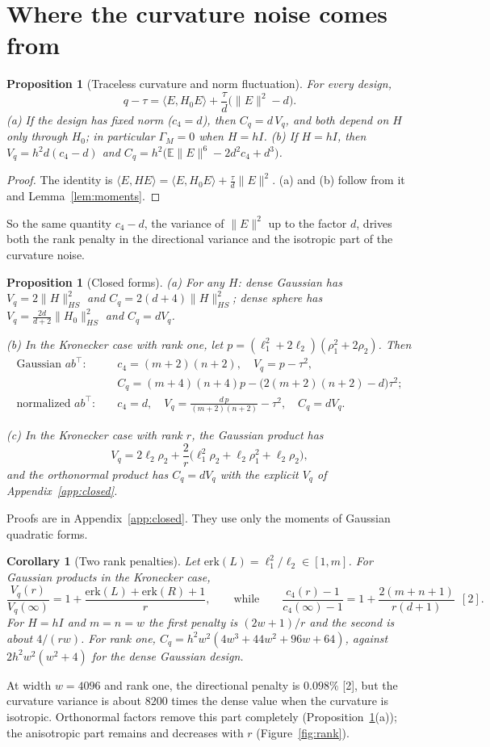 \documentclass[11pt]{article}
\newtheorem{proposition}[theorem]{Proposition}
\newtheorem{corollary}[theorem]{Corollary}
\theoremstyle{remark}
\newcommand{\E}{\mathbb{E}}
\newcommand{\ip}[2]{\langle #1,#2\rangle}
\begin{document}
\section{Where the curvature noise comes from}
\begin{proposition}[Traceless curvature and norm fluctuation]\label{prop:structure}
For every design,
\[
q-\tau=\ip{E}{H_0E}+\frac{\tau}{d}\big(\|E\|^2-d\big).
\]
(a) If the design has fixed norm ($c_4=d$), then $C_q=d\,V_q$, and both depend on $H$ only through $H_0$; in particular $\Gamma_M=0$ when $H=hI$. (b) If $H=hI$, then $V_q=h^2d(c_4-d)$ and $C_q=h^2\big(\E\|E\|^6-2d^2c_4+d^3\big)$.
\end{proposition}
\begin{proof}
The identity is $\ip{E}{HE}=\ip{E}{H_0E}+\frac\tau d\|E\|^2$. (a) and (b) follow from it and Lemma~\ref{lem:moments}.
\end{proof}
So the same quantity $c_4-d$, the variance of $\|E\|^2$ up to the factor $d$, drives both the rank penalty in the directional variance and the isotropic part of the curvature noise.

\begin{proposition}[Closed forms]\label{prop:closed}
(a) For any $H$: dense Gaussian has $V_q=2\|H\|_{HS}^2$ and $C_q=2(d+4)\|H\|_{HS}^2$; dense sphere has $V_q=\frac{2d}{d+2}\|H_0\|_{HS}^2$ and $C_q=dV_q$.

(b) In the Kronecker case with rank one, let $p=(\ell_1^2+2\ell_2)(\rho_1^2+2\rho_2)$. Then
\begin{align*}
\text{Gaussian }ab^\top:&\quad c_4=(m+2)(n+2),\quad V_q=p-\tau^2,\\
&\quad C_q=(m+4)(n+4)p-\big(2(m+2)(n+2)-d\big)\tau^2;\\
\text{normalized }ab^\top:&\quad c_4=d,\quad V_q=\frac{d\,p}{(m+2)(n+2)}-\tau^2,\quad C_q=dV_q .
\end{align*}

(c) In the Kronecker case with rank $r$, the Gaussian product has
\[
V_q=2\ell_2\rho_2+\frac2r\big(\ell_1^2\rho_2+\ell_2\rho_1^2+\ell_2\rho_2\big),
\]
and the orthonormal product has $C_q=dV_q$ with the explicit $V_q$ of Appendix~\ref{app:closed}.
\end{proposition}
Proofs are in Appendix~\ref{app:closed}. They use only the moments of Gaussian quadratic forms.

\begin{corollary}[Two rank penalties]\label{cor:rank}
Let $\mathrm{erk}(L)=\ell_1^2/\ell_2\in[1,m]$. For Gaussian products in the Kronecker case,
\[
\frac{V_q(r)}{V_q(\infty)}=1+\frac{\mathrm{erk}(L)+\mathrm{erk}(R)+1}{r},\qquad\text{while}\qquad\frac{c_4(r)-1}{c_4(\infty)-1}=1+\frac{2(m+n+1)}{r(d+1)}\ \ [2].
\]
For $H=hI$ and $m=n=w$ the first penalty is $(2w+1)/r$ and the second is about $4/(rw)$. For rank one, $C_q=h^2w^2(4w^3+44w^2+96w+64)$, against $2h^2w^2(w^2+4)$ for the dense Gaussian design.
\end{corollary}
At width $w=4096$ and rank one, the directional penalty is $0.098\%$ [2], but the curvature variance is about $8200$ times the dense value when the curvature is isotropic. Orthonormal factors remove this part completely (Proposition~\ref{prop:structure}(a)); the anisotropic part remains and decreases with $r$ (Figure~\ref{fig:rank}).
\end{document}

